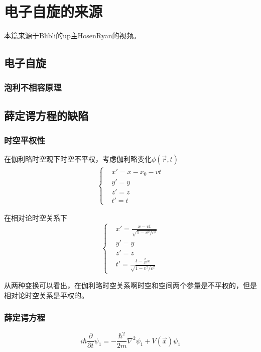 \chapter{电子自旋的来源}

本篇来源于Blibli的up主HosenRyan的视频。

\section{电子自旋}

\subsection*{泡利不相容原理}

\section{薛定谔方程的缺陷}

\subsection*{时空平权性}
在伽利略时空观下时空不平权，考虑伽利略变化$\phi(\vec{r},t)$
\begin{eqnarray}
    \begin{cases}
        & x'=x-x_0-vt\\
        & y'=y\\
        & z'=z\\
        & t'=t
    \end{cases}
\end{eqnarray}

在相对论时空关系下
\begin{equation}
    \begin{cases}
        & x'=\frac{x-vt}{\sqrt{1-v^2/c^2}}\\
        & y'=y\\
        & z'=z\\
        & t'=\frac{t-\frac{v}{c^2}x}{\sqrt{1-v^2/c^2}}
    \end{cases}
\end{equation}

从两种变换可以看出，在伽利略时空关系啊时空和空间两个参量是不平权的，但是相对论时空关系是平权的。

\subsection*{薛定谔方程}

\begin{equation}
    i\hbar \frac{\partial}{\partial t}\psi_1=-\frac{\hbar^2}{2m}\nabla^2\psi_1+V(\vec{x})\psi_1
\end{equation}

